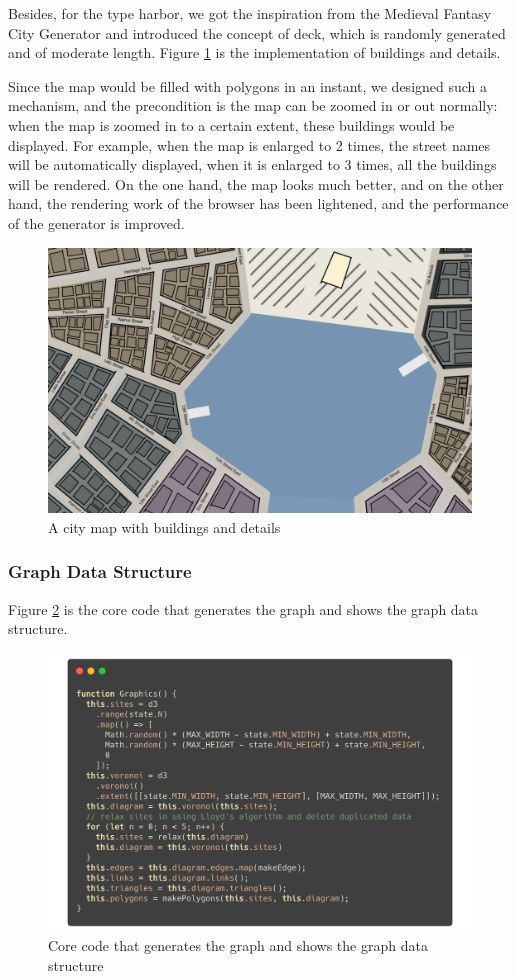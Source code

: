 Besides, for the type harbor, we got the inspiration from the Medieval Fantasy City Generator and introduced the concept of deck, which is randomly generated and of moderate length. Figure \ref{fig:buildings} is the implementation of buildings and details.

Since the map would be filled with polygons in an instant, we designed such a mechanism, and the precondition is the map can be zoomed in or out normally: when the map is zoomed in to a certain extent, these buildings would be displayed. For example, when the map is enlarged to 2 times, the street names will be automatically displayed, when it is enlarged to 3 times, all the buildings will be rendered. On the one hand, the map looks much better, and on the other hand, the rendering work of the browser has been lightened, and the performance of the generator is improved.


\begin{figure}[htbp]
  \includegraphics[width=\textwidth]{section04/assets/Map-details.png}
  \caption{A city map with buildings and details}
  \label{fig:buildings}
\end{figure}

\subsubsection{Graph Data Structure}

Figure \ref{fig:Code graph} is the core code that generates the graph and shows the graph data structure.

\begin{figure}[htbp]
  \includegraphics[width=\textwidth]{section04/assets/Graph.png}
  \caption{Core code that generates the graph and shows the graph data structure}
  \label{fig:Code graph}
\end{figure}
